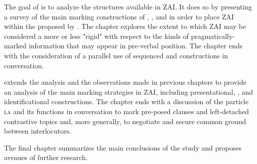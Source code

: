 The goal of  is to analyze the  structures available in ZAI. It does so by presenting a survey of the main  marking constructions of , , and  \citep{lambrecht1994} in order to place ZAI  within the  proposed by \citet{vanvalin1999}. The chapter explores the extent to which ZAI may be considered a more or less "rigid"  with respect to the kinds of pragmatically-marked information that may appear in pre-verbal position. The chapter ends with the consideration of a parallel use of sequenced  and  constructions in conversation. 

 extends the analysis and the observations made in previous chapters to provide an analysis of the main  marking strategies in ZAI, including presentational, , and identificational constructions. The chapter ends with a discussion of the particle \textsc{la} and its functions in conversation to mark pre-posed  clauses and left-detached contrastive topics and, more generally, to negotiate and secure common ground between interlocutors. 


The final chapter summarizes the main conclusions of the study and proposes avenues of further research.





